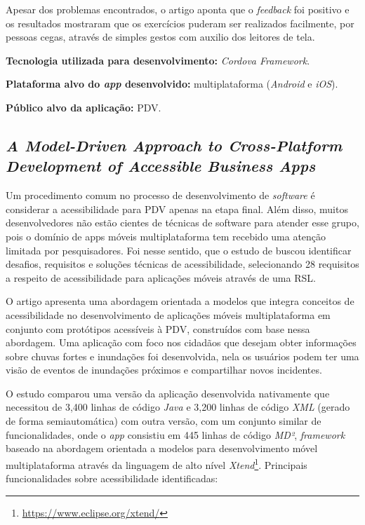 Apesar dos problemas encontrados, o artigo aponta que o \emph{feedback} foi positivo e os resultados mostraram que os exercícios puderam ser realizados facilmente, por pessoas cegas, através de simples gestos com auxilio dos leitores de tela.

\textbf{Tecnologia utilizada para desenvolvimento:} \emph{Cordova Framework}.

\textbf{Plataforma alvo do \emph{app} desenvolvido:} multiplataforma (\emph{Android} e \emph{iOS}).

\textbf{Público alvo da aplicação:} PDV.

\subsection{\emph{A Model-Driven Approach to Cross-Platform Development of Accessible Business Apps}}

Um procedimento comum no processo de desenvolvimento de \emph{software} é considerar a acessibilidade para PDV apenas na etapa final. Além disso, muitos desenvolvedores não estão cientes de técnicas de software para atender esse grupo, pois o domínio de apps móveis multiplataforma tem recebido uma atenção limitada por pesquisadores. Foi nesse sentido, que o estudo de  buscou identificar desafios, requisitos e soluções técnicas de acessibilidade, selecionando 28 requisitos a respeito de acessibilidade para aplicações móveis através de uma RSL.

O artigo apresenta uma abordagem orientada a modelos que integra conceitos de acessibilidade no desenvolvimento de aplicações móveis multiplataforma em conjunto com protótipos acessíveis à PDV, construídos com base nessa abordagem. Uma aplicação com foco nos cidadãos que desejam obter informações sobre chuvas fortes e inundações foi desenvolvida, nela os usuários podem ter uma visão de eventos de inundações próximos e compartilhar novos incidentes.

O estudo comparou uma versão da aplicação desenvolvida nativamente que necessitou de 3,400 linhas de código \emph{Java} e 3,200 linhas de código \emph{XML} (gerado de forma semiautomática) com outra versão, com um conjunto similar de funcionalidades, onde o \emph{app} consistiu em 445 linhas de código \emph{MD²}, \emph{framework} baseado na abordagem orientada a modelos para desenvolvimento móvel multiplataforma através da linguagem de alto nível \emph{Xtend}\footnote{\url{https://www.eclipse.org/xtend/}}. Principais funcionalidades sobre acessibilidade identificadas:

